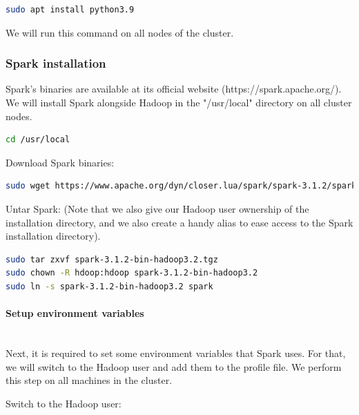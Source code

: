 \documentclass[12pt,english]{book}
\begin{document}
\begin{lstlisting}[language=bash, frame=single, basicstyle=\footnotesize]
sudo apt install python3.9
\end{lstlisting}

We will run this command on all nodes of the cluster.

\subsubsection{Spark installation}

Spark's binaries are available at its official website (https://spark.apache.org/).
We will install Spark alongside Hadoop in the "/usr/local" directory on all cluster nodes.

\begin{lstlisting}[language=bash, frame=single, basicstyle=\footnotesize]
cd /usr/local
\end{lstlisting}

Download Spark binaries:

\begin{lstlisting}[language=bash, frame=single, basicstyle=\footnotesize, breaklines=true, postbreak=\mbox{\textcolor{red}{$\hookrightarrow$}\space}]
sudo wget https://www.apache.org/dyn/closer.lua/spark/spark-3.1.2/spark-3.1.2-bin-hadoop3.2.tgz
\end{lstlisting}

Untar Spark: (Note that we also give our Hadoop user ownership of the installation directory, and we also create a handy alias to ease access to the Spark installation directory).

\begin{lstlisting}[language=bash, frame=single, basicstyle=\footnotesize]
sudo tar zxvf spark-3.1.2-bin-hadoop3.2.tgz
sudo chown -R hdoop:hdoop spark-3.1.2-bin-hadoop3.2
sudo ln -s spark-3.1.2-bin-hadoop3.2 spark
\end{lstlisting}

\paragraph{Setup environment variables}\mbox{}\\

Next, it is required to set some environment variables that Spark uses.
For that, we will switch to the Hadoop user and add them to the profile file.
We perform this step on all machines in the cluster.

Switch to the Hadoop user:
\end{document}
